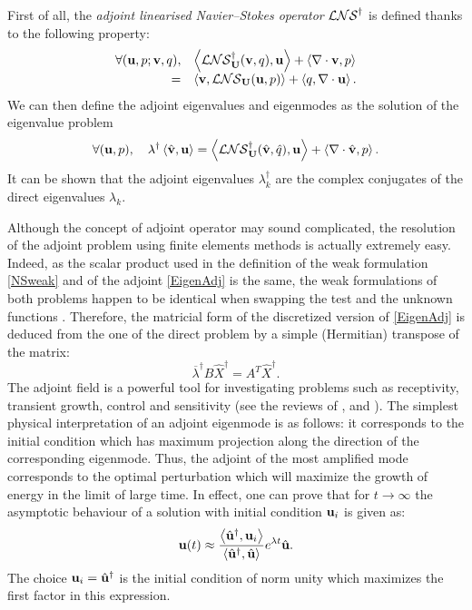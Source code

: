 \documentclass[twocolumn,10pt]{asme2ej}
\newcommand{\be}[1]{ \begin{equation} \label{#1}}
\newcommand{\ee}{\end{equation}}
\newcommand{\bes}[1]{ \begin{equation} \label{#1}\begin{array}{rl}}
\newcommand{\ees}{\end{array}\end{equation}}
\begin{document}
First of all, the {\em adjoint linearised Navier--Stokes operator} ${\cal LNS}^\dag$ is defined thanks to the following 
property:
\bes{NSLAdj}
\forall ( {\bf u}, p ; {\bf v}, q), & \left< {\cal LNS}^\dag_{\bf U}( {\bf v},q) ,{\bf u}\right> + \left< \nabla \cdot {\bf v},p\right>  \\
=& \left< {\bf v}, {\cal LNS}_{\bf U} ({\bf u},p)\right> + \left< q, \nabla \cdot {\bf u}\right>.
\ees
We can then define the adjoint eigenvalues and eigenmodes as the solution of the eigenvalue problem 
\be{EigenAdj} 
\forall ( {\bf u}, p), \quad  \lambda^\dag \left< \hat{\bf v}, {\bf u}\right> =
 \left< {\cal LNS}^\dag_{\bf U}( \hat{\bf v},\hat{q}) ,{\bf u}\right> + \left< \nabla \cdot \hat{\bf v},p\right> . 
\ee
It can be shown \cite{SchmidHenningson2001} that the adjoint eigenvalues $\lambda^\dag_k$ are the complex conjugates of the direct eigenvalues $\lambda_k$. 


Although the concept of adjoint operator may sound complicated, the resolution of the adjoint problem using finite elements methods is actually extremely easy.
Indeed, as the scalar product used in the definition of the weak formulation \eqref{NSweak} and of the adjoint \eqref{EigenAdj} is the same, the weak formulations of both problems happen to be identical when swapping the test and the unknown functions .
Therefore, the matricial form of the discretized version of \eqref{EigenAdj} is deduced from the one of the direct problem by a simple (Hermitian) transpose of the matrix:
\be{Eigen_Adj_matricial}
\overline{\lambda}^\dag B \hat{X}^\dag = A^T \hat{X}^\dag.
\ee
The adjoint field is a powerful tool for investigating problems such as receptivity, transient growth, control and sensitivity (see the reviews of \cite{Jmc2005}, \cite{Ps2007} and \cite{LucBott2014}). The simplest physical interpretation of an adjoint eigenmode is as follows: it corresponds to the initial condition which has maximum projection along the direction of the corresponding eigenmode.
Thus, the adjoint of the most amplified mode corresponds to the optimal perturbation which will maximize the growth of energy in the limit of large time. In effect, one can prove that for $t \rightarrow \infty$  the asymptotic behaviour of a solution with initial condition ${\bf u}_i$  is given as:
$$
{\bf u}(t) \approx 
\frac{ \left< \hat{\bf u}^\dag, {\bf u}_i\right>}{\left<\hat{\bf u}^\dag, \hat{\bf u}\right>} 
e^{\lambda t} \hat{\bf u}.
$$
The choice ${\bf u}_i = \hat{\bf u}^\dag$ is the initial condition of norm unity which maximizes the first factor in this expression.
\end{document}
